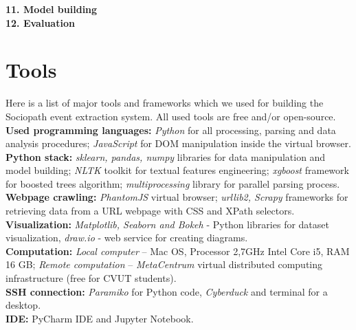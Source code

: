 \textbf{11. Model building}\\

\textbf{12. Evaluation}\\

\section{Tools}

Here is a list of major tools and frameworks which we used for building the Sociopath event extraction system. All used tools are free and/or open-source.\\

\noindent\textbf{Used programming languages:} \textit{Python} for all processing, parsing and data analysis procedures; \textit{JavaScript} for DOM manipulation inside the virtual browser.\\

\noindent\textbf{Python stack:} \textit{sklearn, pandas, numpy} libraries for data manipulation and model building; \textit{NLTK} toolkit for textual features engineering;  \textit{xgboost} framework for boosted trees algorithm; \textit{multiprocessing} library for parallel parsing process. \\

\noindent\textbf{Webpage crawling:} \textit{PhantomJS} virtual browser; \textit{urllib2, Scrapy} frameworks for retrieving data from a URL webpage with CSS and XPath selectors.\\

\noindent\textbf{Visualization:} \textit{Matplotlib, Seaborn and Bokeh} - Python libraries for dataset visualization, \textit{draw.io} - web service for creating diagrams. \\

\noindent\textbf{Computation:} \textit{Local computer} -- Mac OS, Processor 2,7GHz Intel Core i5, RAM 16 GB; \textit{Remote computation} -- \textit{MetaCentrum} virtual distributed computing infrastructure (free for CVUT students).\\

\noindent\textbf{SSH connection:} \textit{Paramiko} for Python code, \textit{Cyberduck} and terminal for a desktop.\\

\noindent\textbf{IDE:} PyCharm IDE and Jupyter Notebook.\\





